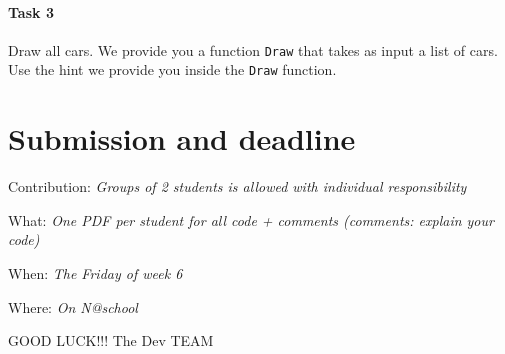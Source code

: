 \documentclass[10pt,a4paper]{article}
\begin{document}
\paragraph{Task 3} Draw all cars. We provide you a function \texttt{Draw} that takes as input a list of cars. Use the hint we provide you inside the \texttt{Draw} function.

\section{Submission and deadline}

\noindent
Contribution: \textit{Groups of 2 students is allowed with individual responsibility}

\noindent
What: \textit{One PDF per student for all code + comments (comments: explain your code)}

\noindent
When: \textit{The Friday of week 6}

\noindent
Where: \textit{On N@school}


\vspace{5cm}
\huge
\centering
GOOD LUCK!!! The Dev TEAM \smiley 

	
\end{document}
